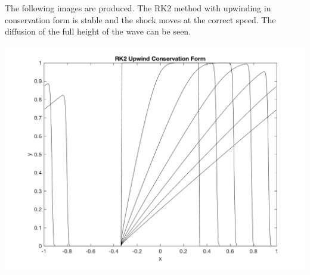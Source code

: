 \documentclass[11pt, oneside]{article}
\begin{document}
\begin{enumerate}
    The following images are produced.
    The RK2 method with upwinding in conservation form is stable and the
    shock moves at the correct speed.
    The diffusion of the full height of the wave can be seen.
    \begin{center}
      \includegraphics[scale=0.5]{Figures/08_13.png}
    \end{center}


\end{enumerate}
\end{document}

